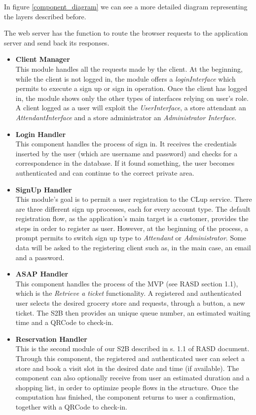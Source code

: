 \documentclass[table, 12pt]{article}
\begin{document}
In figure \ref{component_diagram} we can see a more detailed diagram representing the layers described before.

The web server has the function to route the browser requests to the application server and send back its responses.

\begin{itemize}
    \item \textbf{Client Manager}\\This module handles all the requests made by the client. At the beginning, while the client is not logged in, the module offers a \textit{loginInterface} which permits to execute a sign up or sign in operation. Once the client has logged in, the module shows only the other types of interfaces relying on user's role. A client logged as a user will exploit the \textit{UserInterface}, a store attendant an \textit{AttendantInterface} and a store administrator an \textit{Administrator Interface}.
    \item \textbf{Login Handler}\\This component handles the process of sign in. It receives the credentials inserted by the user (which are username and password) and checks for a correspondence in the database. If it found something, the user becomes authenticated and can continue to the correct private area.
    \item \textbf{SignUp Handler}\\This module's goal is to permit a user registration to the CLup service. There are three different sign up processes, each for every account type. The default registration flow, as the application's main target is a customer, provides the steps in order to register as user. However, at the beginning of the process, a prompt permits to switch sign up type to \textit{Attendant} or \textit{Administrator}. Some data will be asked to the registering client such as, in the main case, an email and a password.
    \item \textbf{ASAP Handler}\\This component handles the process of the MVP (see RASD section 1.1), which is the \textit{Retrieve a ticket} functionality. A registered and authenticated user selects the desired grocery store and requests, through a button, a new ticket. The S2B then provides an unique queue number, an estimated waiting time and a QRCode to check-in.
    \item \textbf{Reservation Handler}\\This is the second module of our S2B described in s. 1.1 of RASD document. Through this component, the registered and authenticated user can select a store and book a visit slot in the desired date and time (if available). The component can also optionally receive from user an estimated duration and a shopping list, in order to optimize people flows in the structure. Once the computation has finished, the component returns to user a confirmation, together with a QRCode to check-in.

\end{itemize}
\end{document}
